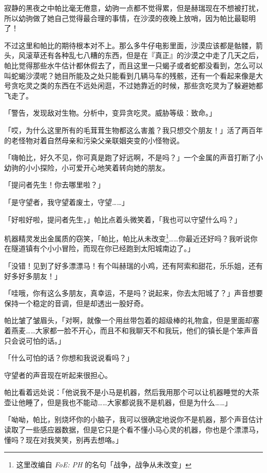 
寂静的黑夜之中帕比毫无倦意，幼驹一点都不觉得累，但是赫瑞现在不想被打扰，所以幼驹做了她自己觉得最合理的事情，在沙漠的夜晚上放哨，因为帕比最聪明了！

不过这里和帕比的期待根本对不上。那么多牛仔电影里面，沙漠应该都是骷髅，箭头，风滚草还有各种乱七八糟的东西，但是在『真正』的沙漠之中走了几天之后，帕比觉得那些水牛估计都休假去了，而且这里一只蝎子或者蛇都没看到，怎么可以叫蛇蝎沙漠呢？她目所能及之处只能看到几辆马车的残骸，还有一个看起来像是大号贪吃灵之类的东西在不远处闲逛，不过她靠近的时候，那些贪吃灵为了躲避她都飞走了。

「警告，发现敌对生物。分析中，变异贪吃灵。威胁等级：致命。」

「哎，为什么这里所有的毛茸茸生物都这么害羞？我只想交个朋友！」活了两百年的老怪物对着自然母亲和污染父亲联姻突变的小怪物说。

「嗨帕比，好久不见，你可真是跑了好远啊，不是吗？」一个金属的声音打断了小幼驹的小小探险，小可爱开心地笑着转向她的朋友。

「提问者先生！你去哪里啦？」

「是守望者，我守望着废土，守望……」

「好啦好啦，提问者先生，」帕比点着头微笑着，「我也可以守望什么吗？」

机器精灵发出金属质的窃笑，「帕比，帕比从未改变\footnote{这里改编自 \emph{FoE: PH} 的名句「战争，战争从未改变」}……你最近还好吗？我听说你在隧道镇有个小小冒险，而现在你已经跑到太阳城南边了。」

「没错！见到了好多漂漂马！有个叫赫瑞的小鸡，还有阿索和甜花，乐乐姐，还有好多好多朋友！」

「哇哦，你有这么多朋友，真幸运，不是吗？说起来，你去太阳城了？」声音想要保持一个稳定的音调，但是却透出一股好奇。

帕比皱了皱眉头，「对啊，就像一个用丝带包着的超级棒的礼物盒，但是里面却塞着燕麦……大家都一脸不开心，而且不和我聊天不和我玩，他们的镇长是个笨声音只会说可怕的话。」

「什么可怕的话？你想和我说说看吗？」

守望者的声音现在听起来很担心。

帕比看着远处说：「他说我不是小马是机器，然后我用那个可以让机器睡觉的大茶壶让他睡了，但是我也不能动……大家都说我不是机器，但是为什么……」

「呦呦，帕比，别烧坏你的小脑子，我可以很确定地说你不是机器，那个声音估计读取了一些感应器数据，但是它只是个看不懂小马心灵的机器，你也是个漂漂马，懂吗？现在对我笑笑，别再去想咯。」

